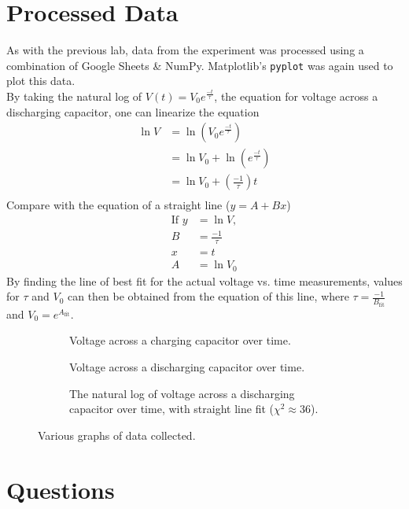 \documentclass{article}
\begin{document}
\section{Processed Data} \label{dataproc}
	As with the previous lab, data from the experiment was processed using a combination of Google Sheets \& NumPy. Matplotlib's \texttt{pyplot} was again used to plot this data.\\
	By taking the natural log of $V(t)=V_0e^{\frac{-t}{\tau}}$, the equation for voltage across a discharging capacitor, one can linearize the equation
	\begin{align*}
		\ln{V}&=\ln{(V_0e^\frac{-t}{\tau})}\\
		&= \ln{V_0} + \ln{(e^\frac{-t}{\tau})}\\
		&= \ln{V_0} +\left(\frac{-1}{\tau}\right)t\\
	\end{align*}
	Compare with the equation of a straight line ($y=A+Bx$)
	\begin{align*}
		\text{If } y &= \ln{V},\\
		B &= \frac{-1}{\tau}\\
		x &= t\\
		A &= \ln{V_0}
	\end{align*}
	By finding the line of best fit for the actual voltage vs. time measurements, values for $\tau$ and $V_0$ can then be obtained from the equation of this line, where $\tau = \frac{-1}{B_\mathrm{fit}}$ and $V_0 = e^{A_\mathrm{fit}}$.
		\begin{figure}[h]
			\begin{subfigure}{0.3\textwidth}
				
				\caption{Voltage across a charging capacitor over time.}
			\end{subfigure}
			\begin{subfigure}{0.3\textwidth}
				
				\caption{Voltage across a discharging capacitor over time.}
			\end{subfigure}
			\begin{subfigure}{0.3\textwidth}
				
				\caption{The natural log of voltage across a discharging capacitor over time, with straight line fit ($\chi^2 \approx 36$).}
				\label{fit}
			\end{subfigure}
			\caption{Various graphs of data collected.}
		\end{figure}
	
	

\section{Questions}
\end{document}
